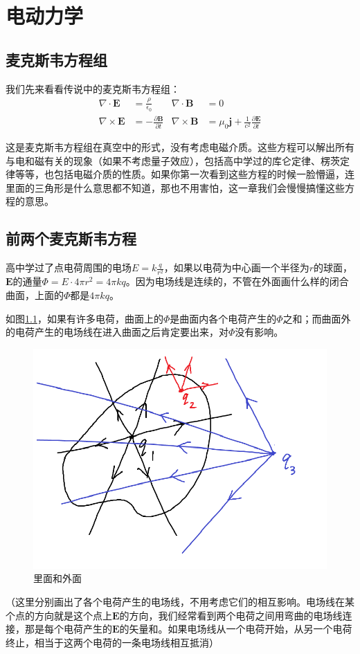 \chapter{电动力学}
\section{麦克斯韦方程组}
我们先来看看传说中的麦克斯韦方程组：
\begin{align*}
\nabla \cdot \mathbf{E}&=\frac{\rho}{\epsilon_0} & \nabla \cdot \mathbf{B}&=0 \\
\nabla \times \mathbf{E}&=-\frac{\partial \mathbf{B}}{\partial t} & \nabla \times \mathbf{B}&=\mu_0 \mathbf{j}+\frac{1}{c^2} \frac{\partial \mathbf{E}}{\partial t}
\end{align*}

这是麦克斯韦方程组在真空中的形式，没有考虑电磁介质。这些方程可以解出所有与电和磁有关的现象（如果不考虑量子效应），包括高中学过的库仑定律、楞茨定律等等，也包括电磁介质的性质。如果你第一次看到这些方程的时候一脸懵逼，连里面的三角形是什么意思都不知道，那也不用害怕，这一章我们会慢慢搞懂这些方程的意思。
\section{前两个麦克斯韦方程}
高中学过了点电荷周围的电场$E=k \frac{q}{r^2}$，如果以电荷为中心画一个半径为$r$的球面，$\mathbf{E}$的通量$\Phi=E \cdot 4 \pi r^2=4 \pi k q$。因为电场线是连续的，不管在外面画什么样的闭合曲面，上面的$\Phi$都是$4 \pi k q$。

如图\ref{fig-elec-flux}，如果有许多电荷，曲面上的$\Phi$是曲面内各个电荷产生的$\Phi$之和；而曲面外的电荷产生的电场线在进入曲面之后肯定要出来，对$\Phi$没有影响。
\begin{figure}[htb]
\centering
\includegraphics[width=0.33\linewidth]{fig/elec-flux.png}
\caption{里面和外面}
\label{fig-elec-flux}
\end{figure}

（这里分别画出了各个电荷产生的电场线，不用考虑它们的相互影响。电场线在某个点的方向就是这个点上$\mathbf{E}$的方向，我们经常看到两个电荷之间用弯曲的电场线连接，那是每个电荷产生的$\mathbf{E}$的矢量和。如果电场线从一个电荷开始，从另一个电荷终止，相当于这两个电荷的一条电场线相互抵消）

